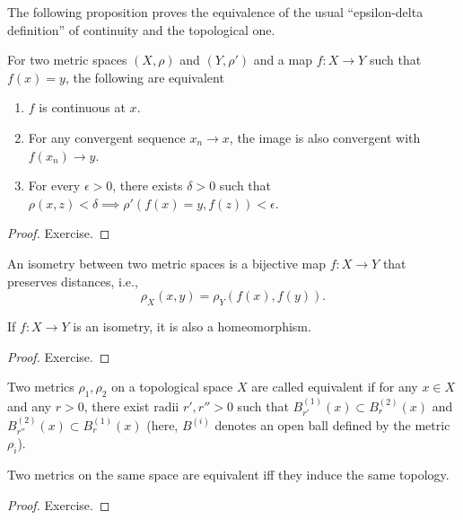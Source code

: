 The following proposition proves the equivalence of the usual ``epsilon-delta definition'' of continuity and the topological one.

\begin{prop}
    For two metric spaces $(X,\rho)$ and $(Y,\rho')$ and a map $f:X\rightarrow Y$ such that $f(x)=y$, the following are equivalent
\begin{enumerate}
    \item $f$ is continuous at $x$.
    \item For any convergent sequence $x_n\rightarrow x$, the image is also convergent with $f(x_n)\rightarrow y$.
    \item For every $\epsilon>0$, there exists $\delta>0$ such that $\rho(x,z)<\delta \implies \rho'(f(x)=y, f(z))<\epsilon$.
\end{enumerate}
\end{prop}
\begin{proof}
    Exercise.
\end{proof}

\begin{defn}[Isometry]
    An isometry between two metric spaces is a bijective map $f:X\rightarrow Y$ that preserves distances, i.e.,
\begin{equation}
    \rho_X(x,y) = \rho_Y(f(x), f(y)).
\end{equation}
\end{defn}

\begin{prop}
    If $f:X\rightarrow Y$ is an isometry, it is also a homeomorphism.
\end{prop}
\begin{proof}
    Exercise.
\end{proof}

\begin{defn}
    Two metrics $\rho_1,\rho_2$ on a topological space $X$ are called equivalent if for any $x\in X$ and any $r>0$, there exist radii $r',r''>0$ such that $B^{(1)}_{r'}(x)\subset B^{(2)}_{r}(x)$ and $B^{(2)}_{r''}(x)\subset B^{(1)}_{r}(x)$ (here, $B^{(i)}$ denotes an open ball defined by the metric $\rho_i$).
\end{defn}

\begin{thm}
    Two metrics on the same space are equivalent iff they induce the same topology.
\end{thm}
\begin{proof}
    Exercise.
\end{proof}

